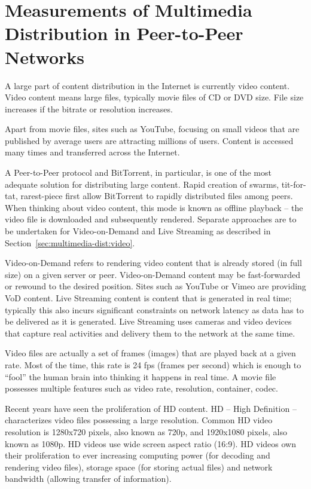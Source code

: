 
\chapter{Measurements of Multimedia Distribution in Peer-to-Peer Networks}
\label{chapter:multimedia-dist}

A large part of content distribution in the Internet is currently video
content. Video content means large files, typically movie files of CD or DVD
size. File size increases if the bitrate or resolution increases.

Apart from movie files, sites such as YouTube, focusing on small videos that
are published by average users are attracting millions of users. Content is
accessed many times and transferred across the Internet.

A Peer-to-Peer protocol and BitTorrent, in particular, is one of the most
adequate solution for distributing large content. Rapid creation of swarms,
tit-for-tat, rarest-piece first allow BitTorrent to rapidly distributed files
among peers. When thinking about video content, this mode is known as offline
playback -- the video file is downloaded and subsequently rendered. Separate
approaches are to be undertaken for Video-on-Demand and Live Streaming as
described in Section~\ref{sec:multimedia-dist:video}.

Video-on-Demand refers to rendering video content that is already stored (in
full size) on a given server or peer. Video-on-Demand content may be
fast-forwarded or rewound to the desired position. Sites such as YouTube or
Vimeo are providing VoD content. Live Streaming content is content that is
generated in real time; typically this also incurs significant constraints on
network latency as data has to be delivered as it is generated. Live Streaming
uses cameras and video devices that capture real activities and delivery them
to the network at the same time.

Video files are actually a set of frames (images) that are played back at a
given rate. Most of the time, this rate is 24 fps (frames per second) which is
enough to ``fool'' the human brain into thinking it happens in real time. A
movie file possesses multiple features such as video rate, resolution,
container, codec.

Recent years have seen the proliferation of HD content. HD -- High Definition
-- characterizes video files possessing a large resolution. Common HD video
resolution is 1280x720 pixels, also known as 720p, and 1920x1080 pixels, also
known as 1080p. HD videos use wide screen aspect ratio (16:9). HD videos own
their proliferation to ever increasing computing power (for decoding and
rendering video files), storage space (for storing actual files) and network
bandwidth (allowing transfer of information).

